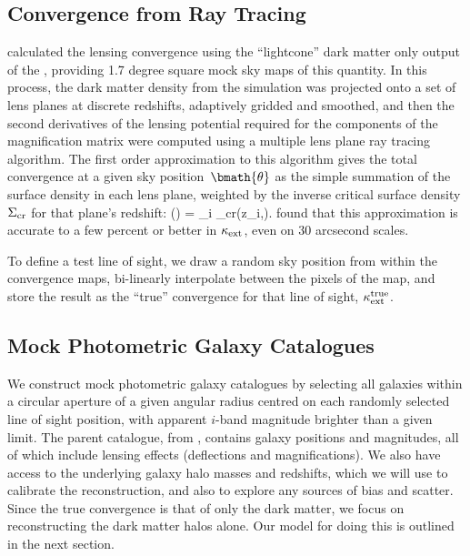 \documentclass[useAMS,usenatbib,a4paper]{mn2e}
\begin{document}

\subsection{Convergence from Ray Tracing}
\label{sec:MS:raytracing}

\citet{HilbertEtal2009} calculated the lensing convergence using the
``lightcone'' dark matter only  output of the \MS, providing 1.7 degree
square  mock sky maps of this quantity. In this process, the dark matter
density from the simulation was projected onto a set of lens planes at
discrete redshifts, adaptively gridded and smoothed, and then the second
derivatives of the  lensing potential required for the components of the
magnification matrix were computed using a multiple lens plane ray tracing
algorithm. The first order approximation to this algorithm \citep[equation 17
of][]{HilbertEtal2009} gives the total convergence at a given sky
position~$\bmath{\theta}$ as the simple summation of the surface density in
each lens plane, weighted by the inverse critical surface density $\Sigma_{\rm
cr}$ for that plane's redshift:
\be
\kappax(\bmath{\theta}) = \sum_i 
                                     {\Sigma_{\rm cr}(z_i,\zs)}.
\ee
\citet{HilbertEtal2009} found that this approximation is accurate to a few percent or better
in $\kappa_{\rm ext}$, even on 30 arcsecond scales.

To define a test line of sight, we draw a random sky position from
within the convergence maps, bi-linearly interpolate between the pixels
of the map, and store the result as the ``true'' convergence for that
line of sight, $\kappa_{\rm ext}^{\rm true}$. 



\subsection{Mock Photometric Galaxy Catalogues}
\label{sec:MS:mocks}

We construct mock photometric galaxy catalogues by selecting all \MS galaxies
within a circular aperture of a given angular radius centred on each randomly
selected line of sight position, with apparent $i$-band magnitude brighter
than a given limit. The parent catalogue, from \citet{HilbertEtal2011},
contains galaxy positions and magnitudes, all of which include lensing effects
(deflections and magnifications). We also have access to the underlying galaxy
halo masses and redshifts, which we will use to calibrate the reconstruction,
and also to explore any sources of bias and scatter. Since the true
convergence is that of only the dark matter, we focus on reconstructing the
dark matter halos alone. Our model for doing this is outlined in the next
section. 
\end{document}
